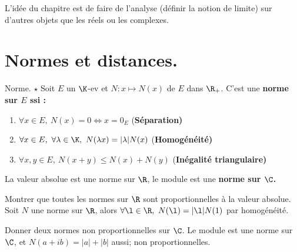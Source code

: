 \documentclass[11pt]{article}
\begin{document}


\thispagestyle{fancy}

L'idée du chapitre est de faire de l'analyse (définir la notion de limite) sur d'autres objets que les réels ou les complexes.

\section{Normes et distances.}

\begin{defi}{Norme. $\star$}{}
    Soit $E$ un $\K$-ev et $N:x\mapsto N(x)$ de $E$ dans $\R_+$. C'est une \bf{norme} sur $E$ ssi :
    \begin{enumerate}
        \item $\forall x \in E, ~ N(x)=0 \iff x = 0_E$ (\bf{Séparation})
        \item $\forall x \in E, ~ \forall \lambda \in \K, ~ N(\lambda x) = |\lambda|N(x)$ (\bf{Homogénéité})
        \item $\forall x,y \in E, ~ N(x+y) \leq N(x) + N(y)$ (\bf{Inégalité triangulaire})
    \end{enumerate}
\end{defi}

\vspace*{-0.8cm}

\begin{ex}{}{}
    La valeur absolue est une norme sur $\R$, le module est une \bf{norme} sur $\C$.
\end{ex}

\vspace*{-0.8cm}

\begin{ex}{}{}
    Montrer que toutes les normes sur $\R$ sont proportionnelles à la valeur absolue.
    \tcblower
    Soit $N$ une norme sur $\R$, alors $\forall \l \in \R, ~ N(\l)=|\l|N(1)$ par homogénéité.
\end{ex}

\vspace*{-0.8cm}

\begin{ex}{}{}
    Donner deux normes non proportionnelles sur $\C$.
    \tcblower
    Le module est une norme sur $\C$, et $N(a+ib)=|a|+|b|$ aussi; non proportionnelles.
\end{ex}
\end{document}
